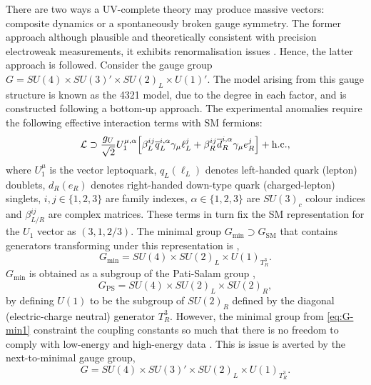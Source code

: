 There are two ways a UV-complete theory may produce massive vectors: composite dynamics \cite{barbieri_anomalies_2016} or a spontaneously broken gauge symmetry. The former approach although plausible and theoretically consistent with precision electroweak measurements, it exhibits renormalisation issues \cite{di_luzio_gauge_2017}. Hence, the latter approach is followed. Consider the gauge group $G = SU(4)\times SU(3)' \times SU(2)_L \times U(1)'$. The model arising from this gauge structure is known as the 4321 model, due to the degree in each factor, and is constructed following a bottom-up approach. The experimental anomalies require the following effective interaction terms with SM fermions:
\begin{equation}\label{eq:LQ-fermion-lag}
    \mathcal{L} \supset \frac{g_U}{\sqrt{2}} U_{1}^{\mu,\alpha} \qty[\beta_{L}^{ij}\overline{q}_L^{i,\alpha}\gamma_\mu \ell^{j}_{L} + \beta_{R}^{ij}\overline{d}_R^{i,\alpha}\gamma_\mu e^{j}_{R}] + \mathrm{h.c.},
\end{equation}
where $U_1^\mu$ is the vector leptoquark, $q_L (\ell_L)$ denotes left-handed quark (lepton) doublets, $d_R (e_R)$ denotes right-handed down-type quark (charged-lepton) singlets, $i,j\in\{1,2,3\}$ are family indexes, $\alpha\in \{1,2,3\}$ are $SU(3)_c$ colour indices and $\beta^{ij}_{L/R}$ are complex matrices. These terms in turn fix the SM representation for the $U_1$ vector as $(3,1,2/3)$. The minimal group $G_{\mathrm{min}} \supset G_{\mathrm{SM}}$ that contains generators transforming under this representation is \cite{baker_high_2019}, 
\begin{equation}\label{eq:G-min1}
    G_{\mathrm{min}} = SU(4) \times SU(2)_L \times U(1)_{T_R^3}.
\end{equation}
$G_{\mathrm{min}}$ is obtained as a subgroup of the Pati-Salam group \cite{pati_lepton_1974}, $$ G_{\mathrm{PS}} = SU(4) \times SU(2)_L \times SU(2)_R,$$ by defining $U(1)$ to be the subgroup of $SU(2)_R$ defined by the diagonal (electric-charge neutral) generator $T_R^3$. However, the minimal group from \eqref{eq:G-min1} constraint the coupling constants so much that there is no freedom to comply with low-energy and high-energy data \cite{baker_high_2019}. This is issue is averted by the next-to-minimal gauge group, $$G = SU(4)\times SU(3)' \times SU(2)_L \times U(1)_{T_R^3}.$$



